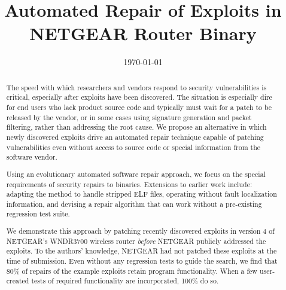 \documentclass{sigcomm-alternate}
\date{\today}
\title{Automated Repair of Exploits in NETGEAR Router Binary}
\begin{document}
\maketitle
\usetikzlibrary{arrows,decorations,decorations.pathreplacing,shapes}

\begin{abstract}
The speed with which researchers and vendors respond to security
vulnerabilities is critical, especially after exploits have been discovered.
The situation is especially dire for end users who lack
product source code and typically must wait for a patch to be released
by the vendor, or in some cases using
signature generation and packet filtering, rather than addressing the
root cause. We propose an alternative in which newly discovered
exploits drive an automated repair technique capable of patching
vulnerabilities even without access to source code or special
information from the software vendor.

Using an evolutionary automated software repair approach, we focus on
the special requirements of security repairs to binaries.  Extensions
to earlier work include: adapting the method to handle stripped ELF
files, operating without fault localization information, and devising
a repair algorithm that can work without a pre-existing regression
test suite.

We demonstrate this approach by patching recently discovered exploits
in version 4 of NETGEAR's WNDR3700 wireless router \emph{before}
NETGEAR publicly addressed the exploits. To the authors' knowledge,
NETGEAR had not patched these exploits at the time of submission.
Even without any regression tests to guide the search, we find that 80\% of
repairs of the example exploits retain program functionality.
When a few user-created tests of required functionality are incorporated, 100\% do so.

\end{abstract}
\end{document}
